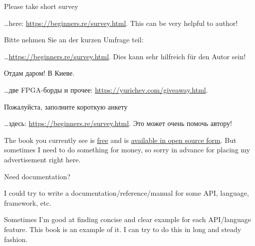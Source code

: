 \vspace*{\fill}

\ifdefined\ENGLISH

\huge
	Please take short survey
\normalsize

\bigskip
\bigskip
\bigskip

\dots here: \url{https://beginners.re/survey.html}.
This can be very helpful to author!

\fi %

\ifdefined\GERMAN

\huge
	Bitte nehmen Sie an der kurzen Umfrage teil:
\normalsize

\bigskip
\bigskip
\bigskip

\dots \url{https://beginners.re/survey.html}.
Dies kann sehr hilfreich für den Autor sein!

\fi %

\ifdefined\RUSSIAN

\huge
	Отдам даром! В Киеве.
\normalsize

\bigskip
\bigskip
\bigskip

\dots две FPGA-борды и прочее: \url{https://yurichev.com/giveaway.html}.

\bigskip
\bigskip
\bigskip

\huge
	Пожалуйста, заполните короткую анкету
\normalsize

\bigskip
\bigskip
\bigskip

\dots здесь: \url{https://beginners.re/survey.html}.
Это может очень помочь автору!

\fi %

\ifdefined\ENGLISH

\bigskip
\bigskip
\bigskip

\huge
\normalsize

\bigskip
\bigskip
\bigskip


The book you currently see is \href{http://beginners.re/}{free} and is \href{https://github.com/dennis714/RE-for-beginners/}{available in open source form}.
But sometimes I need to do something for money, so sorry in advance for placing my advertisement right here.

\iffalse
\Large Need documentation? \normalsize

I could try to write a documentation/reference/manual for some API, language, framework, etc.

Sometimes I'm good at finding concise and clear example for each API/language feature.
This book is an example of it.
I can try to do this in long and steady fashion.

